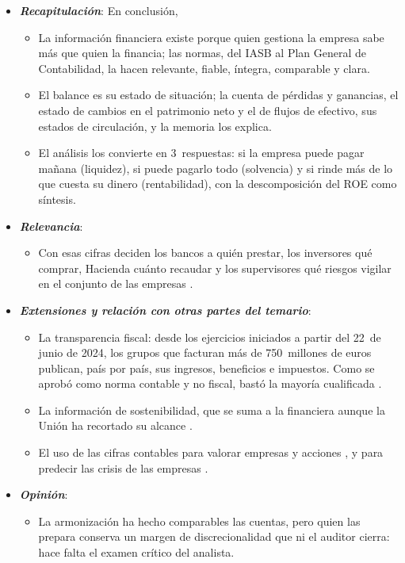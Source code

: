 \documentclass[11pt]{article}
\begin{document}
\begin{itemize}
\item \textbf{\emph{Recapitulación}}: En conclusión,
  \begin{itemize}
  \item La información financiera existe porque quien gestiona la empresa sabe más que quien la financia; las normas, del IASB al Plan General de Contabilidad, la hacen relevante, fiable, íntegra, comparable y clara.
  \item El balance es su estado de situación; la cuenta de pérdidas y ganancias, el estado de cambios en el patrimonio neto y el de flujos de efectivo, sus estados de circulación, y la memoria los explica.
  \item El análisis los convierte en 3~respuestas: si la empresa puede pagar mañana (liquidez), si puede pagarlo todo (solvencia) y si rinde más de lo que cuesta su dinero (rentabilidad), con la descomposición del ROE como síntesis.
  \end{itemize}
\item \textbf{\emph{Relevancia}}:
  \begin{itemize}
  \item Con esas cifras deciden los bancos a quién prestar, los inversores qué comprar, Hacienda cuánto recaudar y los supervisores qué riesgos vigilar en el conjunto de las empresas .
  \end{itemize}
\item \textbf{\emph{Extensiones y relación con otras partes del temario}}:
  \begin{itemize}
  \item La transparencia fiscal: desde los ejercicios iniciados a partir del 22~de junio de 2024, los grupos que facturan más de 750~millones de euros publican, país por país, sus ingresos, beneficios e impuestos. Como se aprobó como norma contable y no fiscal, bastó la mayoría cualificada \nocite{UE2021CBCR,BOE2022Ley28}.
  \item La información de sostenibilidad, que se suma a la financiera aunque la Unión ha recortado su alcance .
  \item El uso de las cifras contables para valorar empresas y acciones  , y para predecir las crisis de las empresas .
  \end{itemize}
\item \textbf{\emph{Opinión}}:
  \begin{itemize}
  \item La armonización ha hecho comparables las cuentas, pero quien las prepara conserva un margen de discrecionalidad que ni el auditor cierra: hace falta el examen crítico del analista.


\end{itemize}
\end{itemize}
\end{document}
